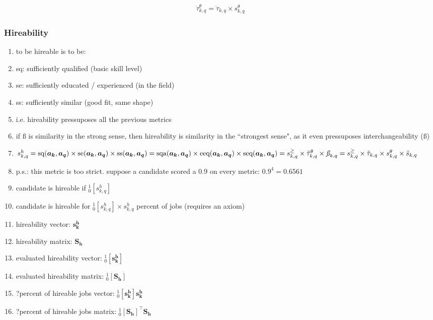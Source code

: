 \documentclass{elsarticle} %
\begin{document}
\begin{gather}
    \ddot{\tau}_{k,q}^{\theta} = \ddot{\tau}_{k,q} \times s_{k,q}^{\theta}
\end{gather}

\subsubsection{Hireability}
\begin{enumerate}
    \item to be hireable is to be:
    \item sq: sufficiently qualified (basic skill level)
    \item se: sufficiently educated / experienced (in the field)
    \item ss: sufficiently similar (good fit, same shape)
    \item i.e. hireability pressuposes all the previous metrics
    \item if $\textit{\ss}$ is similarity in the strong sense, then hireability is
          similarity in the ``strongest sense", as it even pressuposes interchangeability
          ($\textit{\ss}$)
    \item $
              s_{k,q}^{h} =
              \text{sq}(\boldsymbol{a_k},\boldsymbol{a_q}) \times
              \text{se}(\boldsymbol{a_k},\boldsymbol{a_q}) \times
              \text{ss}(\boldsymbol{a_k},\boldsymbol{a_q}) = \\
              \text{sqa}(\boldsymbol{a_k},\boldsymbol{a_q}) \times
              \text{eeq}(\boldsymbol{a_k},\boldsymbol{a_q}) \times
              \text{seq}(\boldsymbol{a_k},\boldsymbol{a_q}) = \\
              s_{k,q}^{\geq} \times
              \ddot{\tau}_{k,q}^{\theta} \times
              \textit{\ss}_{k,q} = \\
              s_{k,q}^{\geq} \times
              \ddot{\tau}_{k,q} \times
              s_{k,q}^{\theta} \times
              \ddot{s}_{k,q}
          $
    \item p.s.: this metric is too strict. suppose a candidate scored a 0.9 on every
          metric: $0.9 ^ 4 = 0.6561$
    \item candidate is hireable if $_{0}^{1}[s_{k,q}^{h}]$
    \item candidate is hireable for $_{0}^{1}[s_{k,q}^{h}] \times s_{k,q}^{h}$ percent of
          jobs (requires an axiom)
    \item hireability vector: $\boldsymbol{s_{k}^{h}}$
    \item hireability matrix: $\boldsymbol{\textbf{S}_{h}}$
    \item evaluated hireability vector: $_{0}^{1}[\boldsymbol{s_{k}^{h}}]$
    \item evaluated hireability matrix: $_{0}^{1}[\boldsymbol{\textbf{S}_{h}}]$
    \item ?percent of hireable jobs vector: $_{0}^{1}[\boldsymbol{s_{k}^{h}}]\boldsymbol{s_{k}^{h}}$
    \item ?percent of hireable jobs matrix: $_{0}^{1}[\boldsymbol{\textbf{S}_{h}}]^{\top}\boldsymbol{\textbf{S}_{h}}$
\end{enumerate}
\end{document}
